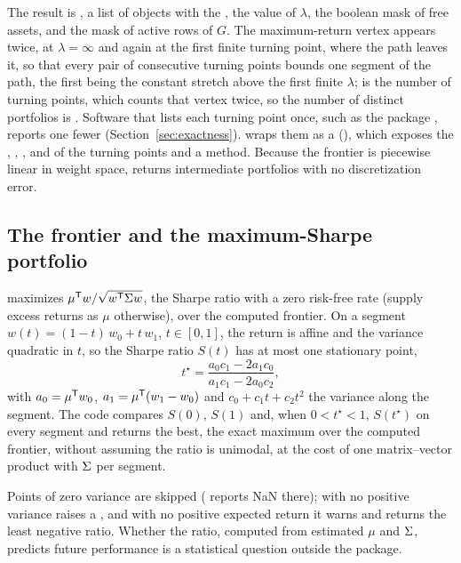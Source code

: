 The result is , a list of  objects with the
, the value  of $\lambda$, the boolean mask  of free
assets, and the mask  of active rows of $G$. The maximum-return
vertex appears twice, at $\lambda = \infty$ and again at the first finite turning point,
where the path leaves it, so that every pair of consecutive turning points bounds one
segment of the path, the first being the constant stretch above the first finite
$\lambda$;  is the number of turning points, which counts that vertex
twice, so the number of distinct portfolios is . Software that lists
each turning point once, such as the  package , reports one fewer
(Section~\ref{sec:exactness}).
 wraps them as a 
(), which exposes the ,
, ,  and  of the
turning points and a  method. Because the frontier is piecewise linear in
weight space,  returns intermediate portfolios with no
discretization error.

\subsection{The frontier and the maximum-Sharpe portfolio}
\label{sec:frontier}

 maximizes $\mu^{\mathsf{T}} w/\sqrt{w^{\mathsf{T}}\Sigma w}$, the Sharpe ratio with a
zero risk-free rate (supply excess returns as $\mu$ otherwise), over the computed
frontier. On a segment $w(t) = (1-t)\,w_0 + t\,w_1$, $t \in [0,1]$, the return is affine
and the variance quadratic in $t$, so the Sharpe ratio $S(t)$ has at most one stationary
point,
\begin{equation}\label{eq:tstar}
t^\star = \frac{a_0 c_1 - 2 a_1 c_0}{a_1 c_1 - 2 a_0 c_2},
\end{equation}
with $a_0 = \mu^{\mathsf{T}} w_0$, $a_1 = \mu^{\mathsf{T}}(w_1 - w_0)$ and $c_0 + c_1 t + c_2 t^2$ the
variance along the segment. The code compares $S(0)$, $S(1)$ and, when
$0 < t^\star < 1$, $S(t^\star)$ on every segment and returns the best, the exact maximum
over the computed frontier, without assuming the ratio is unimodal, at the cost of one
matrix--vector product with $\Sigma$ per segment.

Points of zero variance are skipped ( reports NaN there); with no
positive variance  raises a , and with no positive
expected return it warns and returns the least negative ratio. Whether the ratio,
computed from estimated $\mu$ and $\Sigma$, predicts future performance is a statistical
question outside the package.


